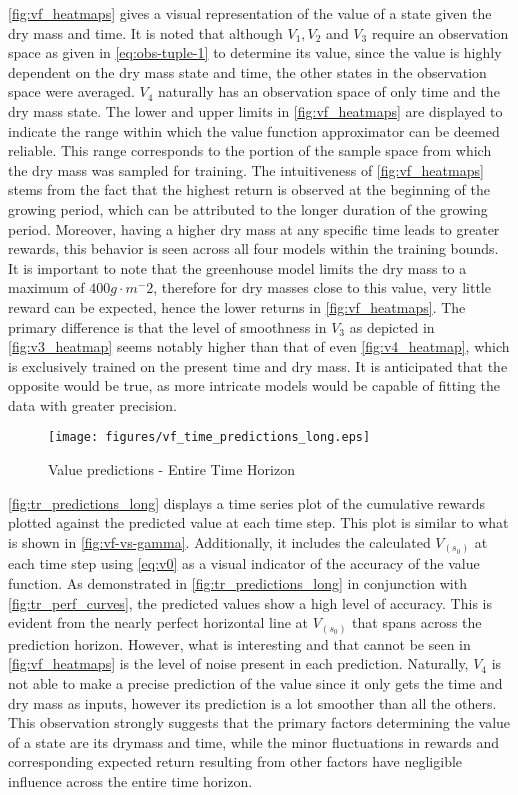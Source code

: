 \autoref{fig:vf_heatmaps} gives a visual representation of the value of a state given the dry mass and time. It is noted that although $V_1,V_2$ and $V_3$ require an observation space as given in \autoref{eq:obs-tuple-1} to determine its value, since the value is highly dependent on the dry mass state and time, the other states in the observation space were averaged. $V_4$ naturally has an observation space of only time and the dry mass state. The lower and upper limits in \autoref{fig:vf_heatmaps} are displayed to indicate the range within which the value function approximator can be deemed reliable. This range corresponds to the portion of the sample space from which the dry mass was sampled for training. The intuitiveness of \autoref{fig:vf_heatmaps} stems from the fact that the highest return is observed at the beginning of the growing period, which can be attributed to the longer duration of the growing period. Moreover,  having a higher dry mass at any specific time leads to greater rewards, this behavior is seen across all four models within the training bounds. It is important to note that the greenhouse model limits the dry mass to a maximum of $400 g \cdot m^-2$, therefore for dry masses close to this value, very little reward can be expected, hence the lower returns in \autoref{fig:vf_heatmaps}. The primary difference is that the level of smoothness in $V_3$ as depicted in \autoref{fig:v3_heatmap} seems notably higher than that of even \autoref{fig:v4_heatmap}, which is exclusively trained on the present time and dry mass. It is anticipated that the opposite would be true, as more intricate models would be capable of fitting the data with greater precision.


\begin{figure}[H]
	\centering
	\texttt{[image: figures/vf\_time\_predictions\_long.eps]}
	\caption{Value predictions - Entire Time Horizon}
	\label{fig:tr_predictions_long}
\end{figure}

\autoref{fig:tr_predictions_long} displays a time series plot of the cumulative rewards plotted against the predicted value at each time step. This plot is similar to what is shown in \autoref{fig:vf-vs-gamma}. Additionally, it includes the calculated $V_(s_0)$ at each time step using \autoref{eq:v0} as a visual indicator of the accuracy of the value function. As demonstrated in \autoref{fig:tr_predictions_long} in conjunction with \autoref{fig:tr_perf_curves}, the predicted values show a high level of accuracy. This is evident from the nearly perfect horizontal line at $V_(s_0)$ that spans across the prediction horizon.  However, what is interesting and that cannot be seen in \autoref{fig:vf_heatmaps} is the level of noise present in each prediction. Naturally, $V_4$ is not able to make a precise prediction of the value since it only gets the time and dry mass as inputs, however its prediction is a lot smoother than all the others. This observation strongly suggests that the primary factors determining the value of a state are its drymass and time, while the minor fluctuations in rewards and corresponding expected return resulting from other factors have negligible influence across the entire time horizon.



